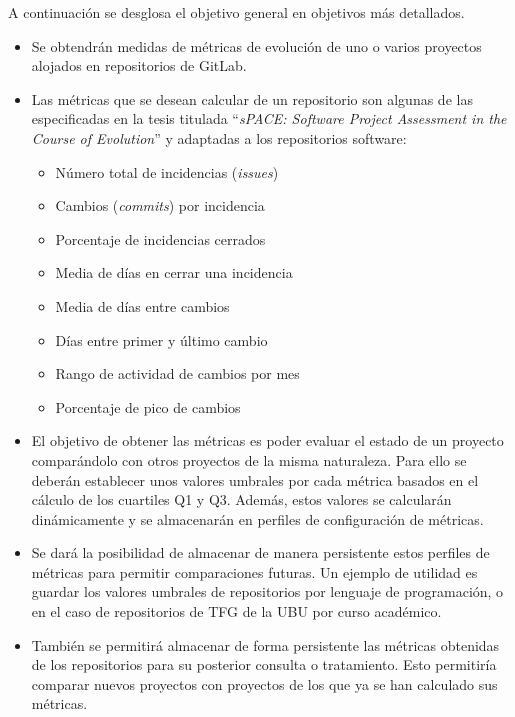 A continuación se desglosa el objetivo general  en objetivos más detallados.
\begin{itemize}
	\tightlist
	\item Se obtendrán medidas de métricas de evolución de uno o varios proyectos alojados en repositorios de GitLab.
	\item Las métricas que se desean calcular de un repositorio  son algunas de las especificadas en la tesis titulada ``\textit{sPACE: Software Project Assessment in the Course of Evolution}'' \citep{ratzinger_space:_2007} y 
	adaptadas a los repositorios software:
	\begin{itemize}
		\tightlist
		\item Número total de incidencias (\textit{issues})
		\item Cambios (\textit{commits}) por incidencia
		\item Porcentaje de incidencias cerrados
		\item Media de días en cerrar una incidencia
		\item Media de días entre cambios
		\item Días entre primer y último cambio
		\item Rango de actividad de cambios por mes
		\item Porcentaje de pico de cambios
	\end{itemize}
	\item El objetivo de obtener las métricas es poder evaluar el estado de un proyecto comparándolo con otros proyectos de la misma naturaleza. Para ello se deberán establecer unos valores umbrales por cada métrica basados en el cálculo de los cuartiles Q1 y Q3. Además, estos valores se calcularán dinámicamente y se almacenarán en perfiles de configuración de métricas.
	\item Se dará la posibilidad de almacenar de manera persistente estos perfiles de métricas para permitir comparaciones futuras. Un ejemplo de utilidad es guardar los valores umbrales de repositorios por lenguaje de programación, o en el caso de repositorios de TFG de la UBU por curso académico.
	\item También se permitirá almacenar de forma persistente las métricas obtenidas de los repositorios para su posterior consulta o tratamiento. Esto permitiría comparar nuevos proyectos con proyectos de los que ya se han calculado sus métricas.
\end{itemize}
